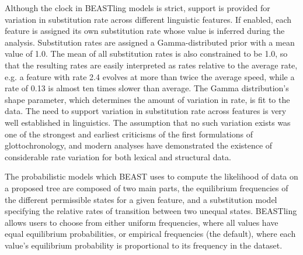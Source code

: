 \documentclass[twocolumn,10pt]{scrartcl}
\begin{document}
Although the clock in BEASTling models is strict, support is provided for variation in substitution rate across different linguistic features.  If enabled, each feature is assigned its own substitution rate whose value is inferred during the analysis.  Substitution rates are assigned a Gamma-distributed prior with a mean value of 1.0.  The mean of all substitution rates is also constrained to be 1.0, so that the resulting rates are easily interpreted as rates relative to the average rate, e.g. a feature with rate 2.4 evolves at more than twice the average speed, while a rate of 0.13 is almost ten times slower than average.  The Gamma distribution's shape parameter, which determines the amount of variation in rate, is fit to the data.  The need to support variation in substitution rate across features is very well established in linguistics.  The assumption that no such variation exists was one of the strongest and earliest criticisms of the first formulations of glottochronology, and modern analyses have demonstrated the existence of considerable rate variation for both lexical\cite{Pagel2007} and structural\cite{Greenhill2010,Dediu2011} data.

The probabilistic models which BEAST uses to compute the likelihood of data on a proposed tree are composed of two main parts, the equilibrium frequencies of the different permissible states for a given feature, and a substitution model specifying the relative rates of transition between two unequal states.  BEASTling allows users to choose from either uniform frequencies, where all values have equal equilibrium probabilities, or empirical frequencies (the default), where each value's equilibrium probability is proportional to its frequency in the dataset.
\end{document}
